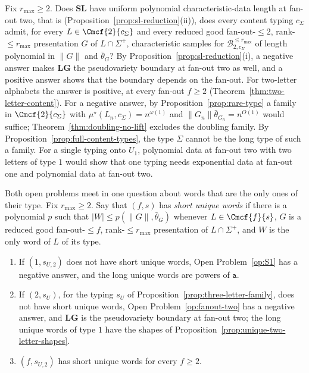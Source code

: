\begin{openproblem}
\label{op:fanout-two}
Fix $r_{\max}\ge2$.  Does $\mathbf{SL}$ have uniform polynomial
characteristic-data length at fan-out two, that is
(Proposition~\ref{prop:sl-reduction}(ii)), does every content typing
$c_\Sigma$ admit, for every $L\in\Cmcf{2}{c_\Sigma}$ and every reduced good
fan-out-$\le2$, rank-$\le r_{\max}$ presentation $G$ of $L\cap\Sigma^+$,
characteristic samples for $\mathcal B^{\le r_{\max}}_{2,c_\Sigma}$ of length
polynomial in $\|G\|$ and $\bar\theta_G$?  By
Proposition~\ref{prop:sl-reduction}(i), a negative answer makes $\mathbf{LG}$
the pseudovariety boundary at fan-out two as well, and a positive answer
shows that the boundary depends on the fan-out.  For two-letter alphabets the
answer is positive, at every fan-out $f\ge2$
(Theorem~\ref{thm:two-letter-content}).  For a negative answer, by
Proposition~\ref{prop:rare-type} a family in $\Cmcf{2}{c_\Sigma}$ with
$\mu^\star(L_n,c_\Sigma)=n^{\omega(1)}$ and $\|G_n\|\bar\theta_{G_n}=n^{O(1)}$
would suffice; Theorem~\ref{thm:doubling-no-lift} excludes the doubling family.  By Proposition~\ref{prop:full-content-types}, the type $\Sigma$ cannot be the long type of such a family.  For a single typing onto $U_1$, polynomial data at fan-out
two with two letters of type $1$ would show that one typing needs exponential
data at fan-out one and polynomial data at fan-out two.
\end{openproblem}

Both open problems meet in one question about words that are the only ones of
their type.  Fix $r_{\max}\ge2$.  Say that $(f,s)$ has \emph{short unique words}
if there is a polynomial $p$ such that $|W|\le p(\|G\|,\bar\theta_G)$ whenever
$L\in\Cmcf{f}{s}$, $G$ is a reduced good fan-out-$\le f$, rank-$\le r_{\max}$
presentation of $L\cap\Sigma^+$, and $W$ is the only word of $L$ of its type.

\begin{proposition}
\label{prop:unique-word-route}
\begin{enumerate}[label=\textup{(\roman*)},leftmargin=*]
\item If $(1,s_{U,2})$ does not have short unique words, Open
Problem~\ref{op:S1} has a negative answer, and the long unique words are
powers of $\mathtt a$.
\item If $(2,s_U)$, for the typing $s_U$ of
Proposition~\ref{prop:three-letter-family}, does not have short unique words,
Open Problem~\ref{op:fanout-two} has a negative answer, and $\mathbf{LG}$ is the
pseudovariety boundary at fan-out two; the long unique words of type $1$ have the
shapes of Proposition~\ref{prop:unique-two-letter-shapes}.
\item $(f,s_{U,2})$ has short unique words for every $f\ge2$.
\end{enumerate}
\end{proposition}

